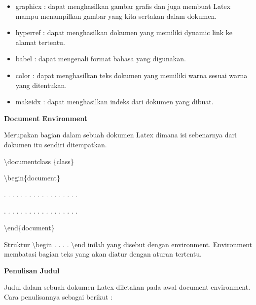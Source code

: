 \begin{itemize}
\item graphicx : dapat menghasilkan gambar grafis dan juga membuat Latex mampu menampilkan gambar yang kita sertakan dalam dokumen.
\item hyperref : dapat menghasilkan dokumen yang memiliki dynamic link ke alamat tertentu.
\item babel : dapat mengenali format bahasa yang digunakan.
\item color : dapat menghasilkan teks dokumen yang memiliki warna sesuai warna yang ditentukan.
\item makeidx : dapat menghasilkan indeks dari dokumen yang dibuat.
\end{itemize}
\textbf{Document Environment}\par \vspace{12pt}

Merupakan bagian dalam sebuah dokumen Latex dimana isi sebenarnya dari dokumen itu sendiri ditempatkan.
\par \vspace{12pt}
$\setminus$documentclass \{class\}\par \vspace{12pt}

$\setminus$begin\{document\}\par \vspace{12pt}

. . . . . . . . . . . . . . . . . .

. . . . . . . . . . . . . . . . . .\par \vspace{12pt}

$\setminus$end\{document\}\par \vspace{12pt}

Struktur $\setminus$begin . . . . $\setminus$end inilah yang disebut dengan environment. Environment membatasi bagian teks yang akan diatur dengan aturan tertentu.\par \vspace{12pt}

\textbf{Penulisan Judul}\par \vspace{12pt}

Judul dalam sebuah dokumen Latex diletakan pada awal document 
environment. Cara penulisannya sebagai berikut :\par \vspace{12pt}

